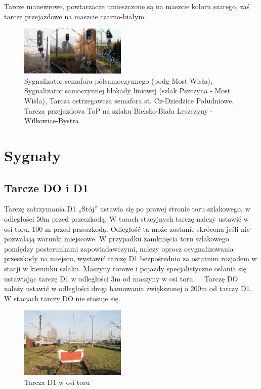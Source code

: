 Tarcze manewrowe, powtarzacze umieszczone są na maszcie koloru szarego, zaś tarcze przejazdowe na maszcie czarno-białym.

	\begin{figure}
		\includegraphics[width=0.45\textwidth]{skryptkierownik-img/sygnalizatory.png}
		\caption{Sygnalizator semafora półsamoczynnego (podg Most Wisła), Sygnalizator samoczynnej blokady liniowej (szlak Pszczyna - Most Wisła), Tarcza ostrzegawcza semafora st. Cz-Dziedzice Południowe, Tarcza przejazdowa ToP na szlaku Bielsko-Biała Leszczyny - Wilkowice-Bystra}
	\end{figure}


\section{Sygnały}

\subsection{Tarcze DO i D1}

Tarczę zatrzymania D1 „Stój” ustawia się po prawej stronie toru szlakowego, w odległości 50m przed przeszkodą. W torach stacyjnych tarczę nalezy ustawić w osi toru, 100 m przed przeszkodą. Odległość ta może zostanie skrócona jeśli nie pozwalają warunki miejscowe. W przypadku zamknięcia toru szlakowego pomiędzy posterunkami zapowiadawczymi, nalezy oprocz osygnalizowania przeszkody na miejscu, wystawić tarczę D1 bezpośrednio za ostatnim rozjadem w stacji w kierunku szlaku. Maszyny torowe i pojazdy specjalistyczne osłania się ustawiając tarczę D1 w odległości 3m od maszyny w osi toru.
\ \ Tarczę DO należy ustawić w odległości drogi hamowania zwiększonej o 200m od tarczy D1. W stacjach tarczy DO nie stosuje się.
	\begin{figure}
	\includegraphics[width=0.45\textwidth]{skryptkierownik-img/skryptkierownik-img023.jpg}
	\caption{Tarcza D1 w osi toru}
\end{figure}

